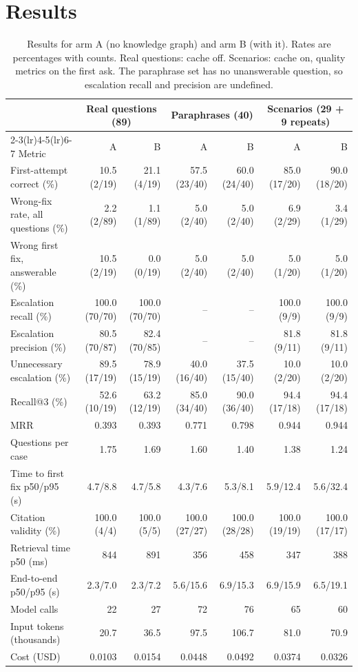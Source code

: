 \documentclass[cameraready]{ieeeconf}
\begin{document}
\section{Results}\label{sec:results}
\begin{table}[t]
\caption{Results for arm A (no knowledge graph) and arm B (with it). Rates are percentages with counts. Real questions: cache off. Scenarios: cache on, quality metrics on the first ask. The paraphrase set has no unanswerable question, so escalation recall and precision are undefined.}
\label{tab:main}
\centering
\footnotesize
\setlength{\tabcolsep}{4.5pt}
\begin{tabular}{@{}lrrrrrr@{}}
\toprule
 & \multicolumn{2}{c}{Real questions (89)} & \multicolumn{2}{c}{Paraphrases (40)} & \multicolumn{2}{c}{Scenarios (29 + 9 repeats)} \\
\cmidrule(lr){2-3}\cmidrule(lr){4-5}\cmidrule(lr){6-7}
Metric & A & B & A & B & A & B \\
\midrule
First-attempt correct (\%) & 10.5 (2/19) & 21.1 (4/19) & 57.5 (23/40) & 60.0 (24/40) & 85.0 (17/20) & 90.0 (18/20) \\
Wrong-fix rate, all questions (\%) & 2.2 (2/89) & 1.1 (1/89) & 5.0 (2/40) & 5.0 (2/40) & 6.9 (2/29) & 3.4 (1/29) \\
Wrong first fix, answerable (\%) & 10.5 (2/19) & 0.0 (0/19) & 5.0 (2/40) & 5.0 (2/40) & 5.0 (1/20) & 5.0 (1/20) \\
Escalation recall (\%) & 100.0 (70/70) & 100.0 (70/70) & -- & -- & 100.0 (9/9) & 100.0 (9/9) \\
Escalation precision (\%) & 80.5 (70/87) & 82.4 (70/85) & -- & -- & 81.8 (9/11) & 81.8 (9/11) \\
Unnecessary escalation (\%) & 89.5 (17/19) & 78.9 (15/19) & 40.0 (16/40) & 37.5 (15/40) & 10.0 (2/20) & 10.0 (2/20) \\
Recall@3 (\%) & 52.6 (10/19) & 63.2 (12/19) & 85.0 (34/40) & 90.0 (36/40) & 94.4 (17/18) & 94.4 (17/18) \\
MRR & 0.393 & 0.393 & 0.771 & 0.798 & 0.944 & 0.944 \\
Questions per case & 1.75 & 1.69 & 1.60 & 1.40 & 1.38 & 1.24 \\
Time to first fix p50/p95 (s) & 4.7/8.8 & 4.7/5.8 & 4.3/7.6 & 5.3/8.1 & 5.9/12.4 & 5.6/32.4 \\
Citation validity (\%) & 100.0 (4/4) & 100.0 (5/5) & 100.0 (27/27) & 100.0 (28/28) & 100.0 (19/19) & 100.0 (17/17) \\
Retrieval time p50 (ms) & 844 & 891 & 356 & 458 & 347 & 388 \\
End-to-end p50/p95 (s) & 2.3/7.0 & 2.3/7.2 & 5.6/15.6 & 6.9/15.3 & 6.9/15.9 & 6.5/19.1 \\
\midrule
Model calls & 22 & 27 & 72 & 76 & 65 & 60 \\
Input tokens (thousands) & 20.7 & 36.5 & 97.5 & 106.7 & 81.0 & 70.9 \\
Cost (USD) & 0.0103 & 0.0154 & 0.0448 & 0.0492 & 0.0374 & 0.0326 \\
\bottomrule
\end{tabular}
\end{table}
\end{document}
